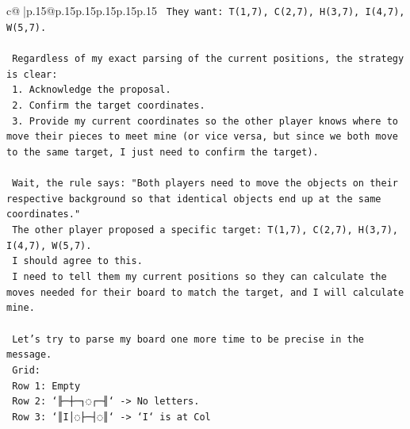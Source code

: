 \documentclass{article}
\begin{document}
{\begin{supertabular}{c@{$\;$}|p{.15\linewidth}@{}p{.15\linewidth}p{.15\linewidth}p{.15\linewidth}p{.15\linewidth}p{.15\linewidth}}
{{{\texttt{   They want: T(1,7), C(2,7), H(3,7), I(4,7), W(5,7).} \\
\\ 
\texttt{   Regardless of my exact parsing of the current positions, the strategy is clear:} \\
\texttt{   1. Acknowledge the proposal.} \\
\texttt{   2. Confirm the target coordinates.} \\
\texttt{   3. Provide my current coordinates so the other player knows where to move their pieces to meet mine (or vice versa, but since we both move to the same target, I just need to confirm the target).} \\
\\ 
\texttt{   Wait, the rule says: "Both players need to move the objects on their respective background so that identical objects end up at the same coordinates."} \\
\texttt{   The other player proposed a specific target: T(1,7), C(2,7), H(3,7), I(4,7), W(5,7).} \\
\texttt{   I should agree to this.} \\
\texttt{   I need to tell them my current positions so they can calculate the moves needed for their board to match the target, and I will calculate mine.} \\
\\ 
\texttt{   Let's try to parse my board one more time to be precise in the message.} \\
\texttt{   Grid:} \\
\texttt{   Row 1: Empty} \\
\texttt{   Row 2: `╟─┼─┐◌┌─╢` {-}> No letters.} \\
\texttt{   Row 3: `║I│◌├─┤◌║` {-}> `I` is at Col} \\
            }
        }
    }
     \\ \\


\end{supertabular}}
\end{document}
